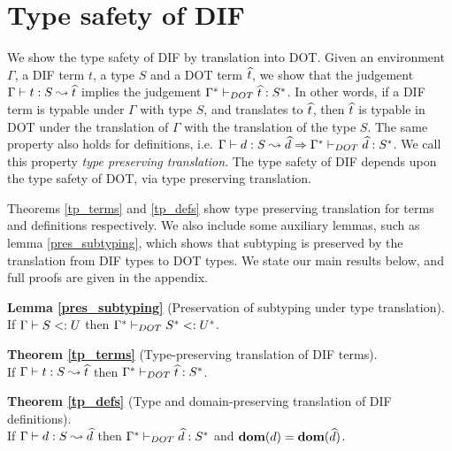 \section{Type safety of DIF}

We show the type safety of DIF by translation into DOT. Given an environment
$\Gamma$, a DIF term $t$, a type $S$ and a DOT term $\widehat{t}$, we show that the
judgement $\Gamma \vdash t: S \leadsto \widehat{t}$ implies the judgement
$\Gamma^{*} \vdash_{DOT} \widehat{t}: S^{*}$. In other words, if a DIF term is
typable under $\Gamma$ with type $S$, and translates to $\widehat{t}$, then
$\widehat{t}$ is typable in DOT under the translation of $\Gamma$ with the
translation of the type $S$. The same property also holds for definitions, i.e.
$\Gamma \vdash d: S \leadsto \widehat{d} \Rightarrow
\Gamma^{*} \vdash_{DOT} \widehat{d}: S^{*}$. We call this property \emph{type
preserving translation}. The type safety of DIF depends upon the type safety of
DOT, via type preserving translation.

Theorems \ref{tp_terms} and \ref{tp_defs} show type preserving translation for
terms and definitions respectively. We also include some auxiliary lemmas, such
as lemma \ref{pres_subtyping}, which shows that subtyping is preserved by the
translation from DIF types to DOT types. We state our main results below, and
full proofs are given in the appendix.

\vspace{3mm}

\noindent \textbf{Lemma \ref{pres_subtyping}} (Preservation of subtyping under
type translation). \\
If $\Gamma \vdash S <: U$ then $\Gamma^{*} \vdash_{DOT} S^{*} <: U^{*}$.

\vspace{3mm}

\noindent \textbf{Theorem \ref{tp_terms}} (Type-preserving translation of DIF
terms). \\
If $\Gamma \vdash t: S \leadsto \widehat{t}$ then
$\Gamma^{*} \vdash_{DOT} \widehat{t}: S^{*}$.

\vspace{3mm}

\noindent \textbf{Theorem \ref{tp_defs}} (Type and domain-preserving
translation of DIF definitions). \\
If $\Gamma \vdash d: S \leadsto \widehat{d}$ then $\Gamma^{*} \vdash_{DOT} \widehat{d}: S^{*}$
and $\textbf{dom}(d) = \textbf{dom}(\widehat{d})$.
